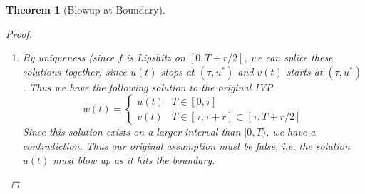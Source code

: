 \documentclass[10pt]{article}         %
\newtheorem{theorem}{Theorem}[section]
\theoremstyle{remark}
\begin{document}
\begin{theorem}[Blowup at Boundary]
\begin{proof}
\begin{enumerate}
\item By uniqueness (since $f$ is Lipshitz on $[0, T + r/2]$, we can splice these solutions together, since $u(t)$ stops at $(\tau, u^*)$ and $v(t)$ starts at $(\tau, u^*)$. Thus we have the following solution to the original IVP.
\[
w(t) = \begin{cases}
u(t) & T \in [0, \tau] \\
v(t) & T \in [\tau, \tau + r] \subset [\tau, T + r/2]
\end{cases}
\]
Since this solution exists on a larger interval than $[0, T)$, we have a contradiction. Thus our original assumption must be false, i.e. the solution $u(t)$ must blow up as it hits the boundary.
\end{enumerate}
\end{proof}
\end{theorem}
\end{document}
